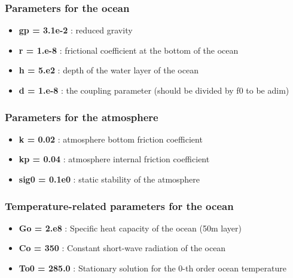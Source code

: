 \documentclass[letterpaper,10pt,english]{sphinxmanual}
\begin{document}
\subsubsection{Parameters for the ocean}
\label{rstfiles/params_maooam:parameters-for-the-ocean}\begin{itemize}
\item {} 
\textbf{gp = 3.1e-2}  : reduced gravity

\item {} 
\textbf{r = 1.e-8}  : frictional coefficient at the bottom of the ocean

\item {} 
\textbf{h = 5.e2}  : depth of the water layer of the ocean

\item {} 
\textbf{d = 1.e-8}  : the coupling parameter (should be divided by f0 to be adim)

\end{itemize}


\subsubsection{Parameters for the atmosphere}
\label{rstfiles/params_maooam:parameters-for-the-atmosphere}\begin{itemize}
\item {} 
\textbf{k = 0.02}  : atmosphere bottom friction coefficient

\item {} 
\textbf{kp = 0.04}  : atmosphere internal friction coefficient

\item {} 
\textbf{sig0 = 0.1e0}  : static stability of the atmosphere

\end{itemize}


\subsubsection{Temperature-related parameters for the ocean}
\label{rstfiles/params_maooam:temperature-related-parameters-for-the-ocean}\begin{itemize}
\item {} 
\textbf{Go = 2.e8}  : Specific heat capacity of the ocean (50m layer)

\item {} 
\textbf{Co = 350}  : Constant short-wave radiation of the ocean

\item {} 
\textbf{To0 = 285.0}  : Stationary solution for the 0-th order ocean temperature

\end{itemize}
\end{document}
